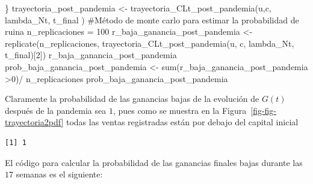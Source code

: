 \documentclass[
  us-letterpaper,
]{scrreprt}
\newenvironment{Shaded}{\begin{snugshade}}{\end{snugshade}}
\newcommand{\CommentTok}[1]{\textcolor[rgb]{0.37,0.37,0.37}{#1}}
\newcommand{\DecValTok}[1]{\textcolor[rgb]{0.68,0.00,0.00}{#1}}
\newcommand{\FunctionTok}[1]{\textcolor[rgb]{0.28,0.35,0.67}{#1}}
\newcommand{\NormalTok}[1]{\textcolor[rgb]{0.00,0.23,0.31}{#1}}
\newcommand{\OtherTok}[1]{\textcolor[rgb]{0.00,0.23,0.31}{#1}}
\newcommand{\SpecialCharTok}[1]{\textcolor[rgb]{0.37,0.37,0.37}{#1}}
\theoremstyle{definition}
\theoremstyle{plain}
\theoremstyle{plain}
\theoremstyle{remark}
\begin{document}
\begin{Shaded}
\begin{Highlighting}[]
\NormalTok{\}}
\NormalTok{trayectoria\_post\_pandemia }\OtherTok{\textless{}{-}} \FunctionTok{trayectoria\_CLt\_post\_pandemia}\NormalTok{(u,c,}
\NormalTok{                                            lambda\_Nt, t\_final )}
\CommentTok{\#Método de monte carlo para estimar la probabilidad de ruina}
\NormalTok{n\_replicaciones }\OtherTok{=} \DecValTok{100}
\NormalTok{r\_baja\_ganancia\_post\_pandemia }\OtherTok{\textless{}{-}} \FunctionTok{replicate}\NormalTok{(n\_replicaciones,}
                          \FunctionTok{trayectoria\_CLt\_post\_pandemia}\NormalTok{(u, c, }
\NormalTok{                                         lambda\_Nt, t\_final)[}\DecValTok{2}\NormalTok{])}
\NormalTok{r\_baja\_ganancia\_post\_pandemia }
\NormalTok{prob\_baja\_ganancia\_post\_pandemia }\OtherTok{\textless{}{-}} \FunctionTok{sum}\NormalTok{(r\_baja\_ganancia\_post\_pandemia }\SpecialCharTok{\textgreater{}}\DecValTok{0}\NormalTok{)}\SpecialCharTok{/}
\NormalTok{n\_replicaciones}
\NormalTok{prob\_baja\_ganancia\_post\_pandemia}
\end{Highlighting}
\end{Shaded}

Claramente la probabilidad de las ganancias bajas de la evolución de
\(G(t)\) después de la pandemia sea \(1\), pues como se muestra en la
Figura~\ref{fig-fig-trayectoria2pdf} todas las ventas registradas están
por debajo del capital inicial

\begin{verbatim}
[1] 1
\end{verbatim}

El código para calcular la probabilidad de las ganancias finales bajas
durante las \(17\) semanas es el siguiente:
\end{document}
